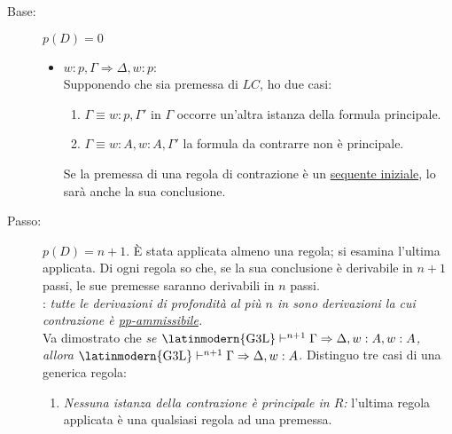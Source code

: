 \documentclass[a4paper,12pt]{article}
\newcommand{\latinmath}[1]{\text{\latinmodern{#1}}} %
\newcommand{\To}{\Rightarrow} %
\begin{document}
\begin{dimo}
	 \phantom{ciao} 
	\begin{description}
		\item[Base:] $p(D) = 0$
		\begin{itemize}
			\item $w:p, \Gamma \To \Delta, w:p$: \\
			Supponendo che sia premessa di $LC$, ho due casi:
			\begin{enumerate}
				\item $\Gamma \equiv w:p, \Gamma'$ \qquad \qquad in $\Gamma$ occorre un'altra istanza della formula principale.
				\item $\Gamma \equiv w:A, w:A, \Gamma'$ \quad la formula da contrarre non è principale.
			\end{enumerate}
			Se la premessa di una regola di contrazione è un \hyperlink{seqetin}{sequente iniziale}, lo sarà anche la sua conclusione.
		\end{itemize}
		\item[Passo:] $p(D) = n+1$. \`{E} stata applicata almeno una regola; si esamina l'ultima applicata. Di ogni regola so che, se la sua conclusione è derivabile in $n+1$ passi, le sue premesse saranno derivabili in $n$ passi. \\ 
		\latinmath{IH}: \emph{tutte le derivazioni di profondità al più $n$ in \latinmath{G3L} sono derivazioni la cui contrazione è \hyperlink{ppamet}{\emph{pp}-ammissibile}.} \\
		Va dimostrato che \emph{se $\latinmath{G3L} \vdash^{n+1} \Gamma \To \Delta, w:A, w:A$, allora $\latinmath{G3L} \vdash^{n+1} \Gamma \To \Delta, w:A$}. Distinguo tre casi di una generica regola:
		\vspace*{-4pt}
		\begin{mathpar}
			\inferrule*[Right=$R$]{\Gamma' \To \Delta' \\ (\Gamma'' \To \Delta'')}{\Gamma \To \Delta, w:A, w:A}
			\vspace*{-12pt}
		\end{mathpar}
		\begin{enumerate}
			\item \emph{Nessuna istanza della contrazione è principale in $R$:} l'ultima regola applicata è una qualsiasi regola ad una premessa.
			\begin{mathpar}

\end{mathpar}
\end{enumerate}
\end{description}
\end{dimo}
\end{document}

